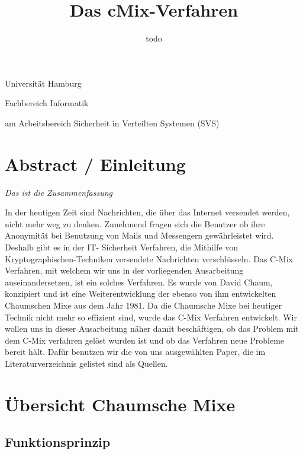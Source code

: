 \documentclass[
    fontsize=12pt,
    headings=small,
    parskip=half,           %
    bibliography=totoc,
    numbers=noenddot,       %
    open=any,               %
    ]{scrreprt}
\title{Das cMix-Verfahren}
\author{todo}
\begin{document}
\begin{titlepage}
\begin{center}\Large
    Universität Hamburg \par
    Fachbereich Informatik
    \vfill
    \makeatletter
    {\Large\textsf{\textbf{\@title}}\par}
    \makeatother
    \bigskip
    am Arbeitsbereich Sicherheit in Verteilten Systemen (SVS) \par
    \bigskip
    \makeatletter
    {\@author} \par
    \makeatother
    \bigskip
    \makeatletter
    {\@date}
    \makeatother
    \vfill

\end{center}
\end{titlepage}

\tableofcontents

\chapter*{Abstract / Einleitung}
\textit{Das ist die Zusammenfassung}

In der heutigen Zeit sind Nachrichten, die über das Internet versendet werden, nicht
mehr weg zu denken. Zunehmend fragen sich die Benutzer ob ihre Anonymität bei
Benutzung von Mails und Messengern gewährleistet wird. Deshalb gibt es in der IT-
Sicherheit Verfahren, die Mithilfe von Kryptographischen-Techniken versendete
Nachrichten verschlüsseln. Das C-Mix Verfahren, mit welchem wir uns in der
vorliegenden Ausarbeitung auseinandersetzen, ist ein solches Verfahren. Es
wurde von David Chaum, konzipiert und ist eine
Weiterentwicklung der ebenso von ihm entwickelten Chaumschen Mixe aus dem Jahr
1981. Da die Chaumsche Mixe bei heutiger Technik nicht mehr so effizient sind,
wurde das C-Mix Verfahren entwickelt.
Wir wollen uns in dieser Ausarbeitung
näher damit beschäftigen, ob das Problem mit dem C-Mix verfahren gelöst wurden ist
und ob das Verfahren neue Probleme bereit hält.
Dafür benutzen wir die von uns ausgewählten Paper, die im Literaturverzeichnis
gelistet sind als Quellen.


\chapter{Übersicht Chaumsche Mixe}

\section{Funktionsprinzip}
\end{document}
